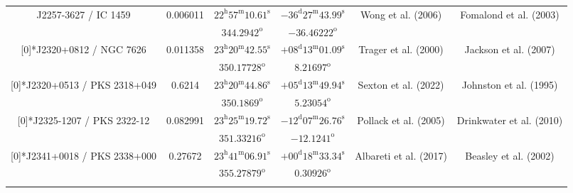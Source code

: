 \begin{landscape}
\begin{longtable}{cccccc}
 \multirow{2}[0]{*}{J2257-3627 / IC 1459} & \multirow{2}[0]{*}{0.006011} &  
    $22^\text{h}57^\text{m}10.61^\text{s}$  & $-36^\text{d}27^\text{m}43.99^\text{s}$  & 
     \multirow{2}[0]{*}{Wong et al. (2006)\cite{RedRef69_2006}}& \multirow{2}[0]{*}{Fomalond et al. (2003) \cite{CoordRef25_2003}} \\*
    & & $344.2942^\text{o}$ & $-36.46222^\text{o}$ & & \\ \addlinespace 

 \multirow{2}[0]{*}{J2320+0812 / NGC 7626} & \multirow{2}[0]{*}{0.011358} &  
    $23^\text{h}20^\text{m}42.55^\text{s}$  & $+08^\text{d}13^\text{m}01.09^\text{s}$  & 
    \multirow{2}[0]{*}{Trager et al. (2000) \cite{RedRef3_2000}}& \multirow{2}[0]{*}{Jackson et al. (2007)\cite{CoordRef83_2007}} \\*
    & & $350.17728^\text{o}$ & $8.21697^\text{o}$ & & \\ \addlinespace 

 \multirow{2}[0]{*}{J2320+0513 / PKS 2318+049} & \multirow{2}[0]{*}{0.6214} &  
    $23^\text{h}20^\text{m}44.86^\text{s}$  & $+05^\text{d}13^\text{m}49.94^\text{s}$  & 
    \multirow{2}[0]{*}{Sexton et al. (2022) \cite{RedRef13_2022}}& \multirow{2}[0]{*}{Johnston et al. (1995)\cite{CoordRef0_1995}} \\*
    & & $350.1869^\text{o}$ & $5.23054^\text{o}$ & & \\ \addlinespace 

\multirow{2}[0]{*}{J2325-1207 / PKS 2322-12} & \multirow{2}[0]{*}{0.082991} &  
    $23^\text{h}25^\text{m}19.72^\text{s}$  & $-12^\text{d}07^\text{m}26.76^\text{s}$  & 
    \multirow{2}[0]{*}{Pollack et al. (2005)\cite{RedRef85_2005}}& \multirow{2}[0]{*}{Drinkwater et al. (2010)\cite{CoordRef85_2010}} \\*
    & & $351.33216^\text{o}$ & $-12.1241^\text{o}$ & & \\ \addlinespace 

 \multirow{2}[0]{*}{J2341+0018 / PKS 2338+000} & \multirow{2}[0]{*}{0.27672} &  
    $23^\text{h}41^\text{m}06.91^\text{s}$  & $+00^\text{d}18^\text{m}33.34^\text{s}$  & 
    \multirow{2}[0]{*}{Albareti et al. (2017)\cite{RedRef9_2017}}& \multirow{2}[0]{*}{Beasley et al. (2002)\cite{CoordRef4_2002}} \\*
    & & $355.27879^\text{o}$ & $0.30926^\text{o}$ & & \\ \addlinespace 


\end{longtable}
\end{landscape}

